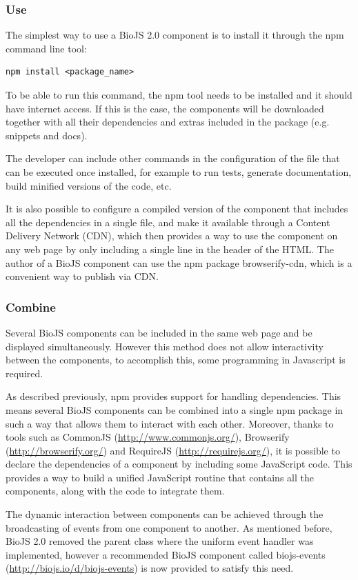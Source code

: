 \subsubsection{Use}
The simplest way to use a BioJS 2.0 component is to install it through the npm command line tool:
\begin{lstlisting}
npm install <package_name>
\end{lstlisting}

To be able to run this command, the npm tool needs to be installed and it should have internet access. If this is the case, the components will be downloaded together with all their dependencies and extras included in the package (e.g. snippets and docs). 

The developer can include other commands in the configuration of the file that can be executed once installed, for example to run tests, generate documentation, build minified versions of the code, etc.

It is also possible to configure a compiled version of the component that includes all the dependencies in a single file, and make it available through a Content Delivery Network (CDN), which then provides a way to use the component on any web page by only including a single line in the header of the HTML. The author of a BioJS component can use the npm package browserify-cdn, which is a convenient way to publish via CDN.

\subsubsection{Combine}
Several BioJS components can be included in the same web page and be displayed simultaneously. However this method does not allow interactivity between the components, to accomplish this, some programming in Javascript is required.
 
As described previously, npm provides support for handling dependencies. This means several BioJS components can be combined into a single npm package in such a way that allows them to interact with each other. Moreover, thanks to tools such as CommonJS (\url{http://www.commonjs.org/}), Browserify (\url{http://browserify.org/}) and RequireJS (\url{http://requirejs.org/}), it is possible to declare the dependencies of a component by including some JavaScript code. This provides a way to build a unified JavaScript routine that contains all the components, along with the code to integrate them.

The dynamic interaction between components can be achieved through the broadcasting of events from one component to another. As mentioned before, BioJS 2.0 removed the parent class where the uniform event handler was implemented, however a recommended BioJS component called biojs-events (\url{http://biojs.io/d/biojs-events}) is now provided to satisfy this need.

